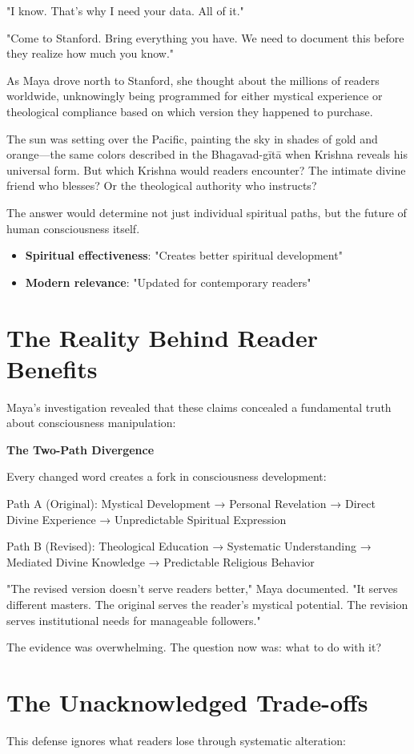 \documentclass[11pt,twoside]{book}
\begin{document}
"I know. That's why I need your data. All of it."

"Come to Stanford. Bring everything you have. We need to document this before they realize how much you know."

As Maya drove north to Stanford, she thought about the millions of readers worldwide, unknowingly being programmed for either mystical experience or theological compliance based on which version they happened to purchase.

The sun was setting over the Pacific, painting the sky in shades of gold and orange—the same colors described in the Bhagavad-gītā when Krishna reveals his universal form. But which Krishna would readers encounter? The intimate divine friend who blesses? Or the theological authority who instructs?

The answer would determine not just individual spiritual paths, but the future of human consciousness itself.
\begin{itemize}
\item \textbf{\textbf{Spiritual effectiveness}}: "Creates better spiritual development"
\item \textbf{\textbf{Modern relevance}}: "Updated for contemporary readers"
\end{itemize}
\section*{The Reality Behind Reader Benefits}
\label{sec:org7f8acb3}

Maya's investigation revealed that these claims concealed a fundamental truth about consciousness manipulation:

\textbf{\textbf{The Two-Path Divergence}}

Every changed word creates a fork in consciousness development:

Path A (Original): 
Mystical Development → Personal Revelation → Direct Divine Experience → Unpredictable Spiritual Expression

Path B (Revised):
Theological Education → Systematic Understanding → Mediated Divine Knowledge → Predictable Religious Behavior

"The revised version doesn't serve readers better," Maya documented. "It serves different masters. The original serves the reader's mystical potential. The revision serves institutional needs for manageable followers."

The evidence was overwhelming. The question now was: what to do with it?
\section*{The Unacknowledged Trade-offs}
\label{sec:org6108da1}
This defense ignores what readers lose through systematic alteration:
\end{document}
